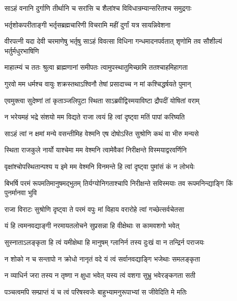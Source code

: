\twolineshloka
{साऽहं वनानि दुर्गाणि तीर्थानि च सरांसि च}
{शैलांश्च विविधान्रम्यान्सरितश्च समुद्रगाः}


\twolineshloka
{भर्तृशोकपरीताङ्गी भर्तृसब्रह्मचारिणी}
{विचरामि महीं दुर्गां यत्र सायन्निवेशना}


\threelineshloka
{वीरपत्नी यदा देवी चरमाणेषु भर्तृषु}
{साऽहं विवत्सा विधिना गन्धमादनपर्वतात्}
{शृणोमि तव सौशील्यं भर्तुर्मधुरभाषिणि}


\twolineshloka
{माहात्म्यं च ततः श्रुत्वा ब्राह्मणानां समीपतः}
{त्वामुपस्थातुमिच्छामि ततश्चाहमिहागता}


\twolineshloka
{गुरवो मम धर्मश्च वायुः शक्रस्तथाऽश्विनौ}
{तेषां प्रसादाच्च न मां कश्चिद्धर्षयते पुमान्}



\twolineshloka
{एवमुक्त्वा सुदेष्णां तां कृताञ्जलिपुटा स्थिता}
{साऽब्रवीद्विस्मयाविष्टा द्रौपदीं योषितां वराम्}


\twolineshloka
{न भरेयमहं भद्रे संशयो मम विद्यते}
{राजा त्वयं हि त्वां दृष्ट्वा मतिं पापां करिष्यति}


\twolineshloka
{साऽहं त्वां न क्षमां मन्ये वसन्तीमिह वेश्मनि}
{एष दोषोऽस्ति सुश्रोणि कथं वा भीरु मन्यसे}


\twolineshloka
{स्थिता राजकुले नार्यो याश्चेमा मम वेश्मनि}
{त्वामेवैकां निरीक्षन्ते विस्मयाद्वरवर्णिनि}


\twolineshloka
{वृक्षांश्चोपस्थितान्पश्य य इमे मम वेश्मनि}
{विनमन्ते हि त्वां दृष्ट्वा पुमांसं कं न लोभयेः}


\threelineshloka
{बिभर्षि परमं रूपमतिमानुषमद्भुतम्}
{तिर्यग्योनिगताश्चापि निरीक्षन्ते सविस्मयाः}
{तव रूपमनिन्द्याङ्गि किं पुनर्मानवा भुवि}


\twolineshloka
{राजा विराटः सुश्रोणि दृष्ट्वा ते परमं वपुः}
{मां विहाय वरारोहे त्वां गच्छेत्सर्वचेतसा}


\twolineshloka
{यं हि त्वमनवद्याङ्गी नरमायतलोचने}
{सुप्रसन्ना हि वीक्षेथाः स कामवशगो भवेत्}


\twolineshloka
{सुस्नाताऽलङ्कृता हि त्वं यमीक्षेथा हि मानुषम्}
{ग्लानिर्न तस्य दुःखं वा न तन्द्रिर्न पराजयः}


\twolineshloka
{न शोको न च सन्तापो न क्रोधो नानृतं वदे}
{यं त्वं सर्वानवद्याङ्गि भजेथाः समलङ्कृता}


\twolineshloka
{न व्याधिर्न जरा तस्य न तृष्णा न क्षुधा भवेत्}
{यस्य त्वं वशगा सुभ्रु भवेरङ्कगता सती}





\twolineshloka
{पञ्चत्वमपि सम्प्राप्तं यं च त्वं परिषस्वजेः}
{बाहुभ्यामनुरूपाभ्यां स जीवेदिति मे मतिः}


